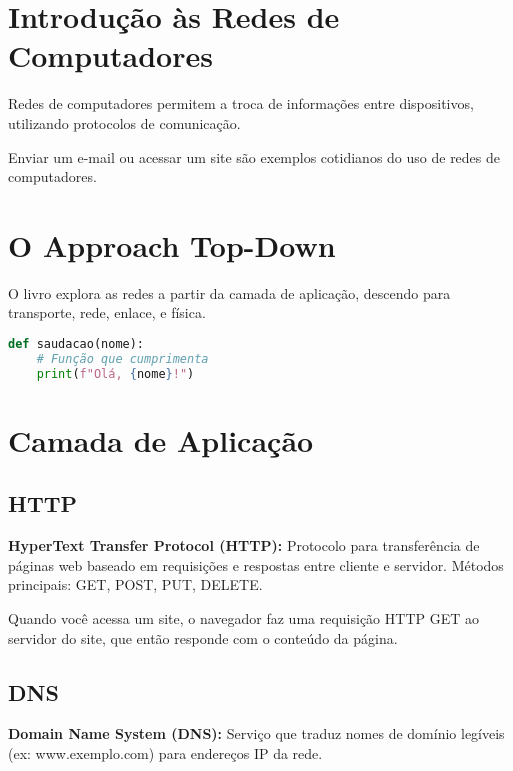 \section{Introdução às Redes de Computadores}
\begin{defbox}
Redes de computadores permitem a troca de informações entre dispositivos, utilizando protocolos de comunicação.
\end{defbox}

\begin{examplebox}
Enviar um e-mail ou acessar um site são exemplos cotidianos do uso de redes de computadores.
\end{examplebox}

\section{O Approach Top-Down}
\begin{notebox}
O livro explora as redes a partir da camada de aplicação, descendo para transporte, rede, enlace, e física.
\end{notebox}

\begin{lstlisting}[style=dracula, language=Python]
def saudacao(nome):
    # Função que cumprimenta
    print(f"Olá, {nome}!")
\end{lstlisting}

\section{Camada de Aplicação}

\subsection{HTTP}
\begin{protocolbox}
\textbf{HyperText Transfer Protocol (HTTP):} Protocolo para transferência de páginas web baseado em requisições e respostas entre cliente e servidor. Métodos principais: GET, POST, PUT, DELETE.
\end{protocolbox}

\begin{examplebox}
Quando você acessa um site, o navegador faz uma requisição HTTP GET ao servidor do site, que então responde com o conteúdo da página.
\end{examplebox}

\subsection{DNS}
\begin{protocolbox}
\textbf{Domain Name System (DNS):} Serviço que traduz nomes de domínio legíveis (ex: www.exemplo.com) para endereços IP da rede.
\end{protocolbox}

